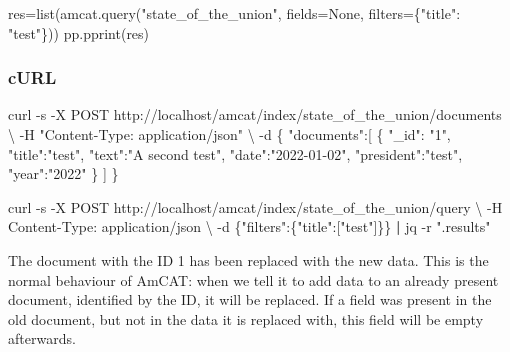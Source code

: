 \documentclass[
  letterpaper,
  DIV=11,
  numbers=noendperiod]{scrreprt}
\newenvironment{Shaded}{\begin{snugshade}}{\end{snugshade}}
\newcommand{\AttributeTok}[1]{\textcolor[rgb]{0.40,0.45,0.13}{#1}}
\newcommand{\BuiltInTok}[1]{\textcolor[rgb]{0.00,0.23,0.31}{#1}}
\newcommand{\DataTypeTok}[1]{\textcolor[rgb]{0.68,0.00,0.00}{#1}}
\newcommand{\ExtensionTok}[1]{\textcolor[rgb]{0.00,0.23,0.31}{#1}}
\newcommand{\KeywordTok}[1]{\textcolor[rgb]{0.00,0.23,0.31}{\textbf{#1}}}
\newcommand{\NormalTok}[1]{\textcolor[rgb]{0.00,0.23,0.31}{#1}}
\newcommand{\OperatorTok}[1]{\textcolor[rgb]{0.37,0.37,0.37}{#1}}
\newcommand{\StringTok}[1]{\textcolor[rgb]{0.13,0.47,0.30}{#1}}
\newcommand{\VariableTok}[1]{\textcolor[rgb]{0.07,0.07,0.07}{#1}}
\begin{document}
\begin{Shaded}
\begin{Highlighting}[]
\NormalTok{res}\OperatorTok{=}\BuiltInTok{list}\NormalTok{(amcat.query(}\StringTok{"state\_of\_the\_union"}\NormalTok{, fields}\OperatorTok{=}\VariableTok{None}\NormalTok{, filters}\OperatorTok{=}\NormalTok{\{}\StringTok{"title"}\NormalTok{: }\StringTok{"test"}\NormalTok{\}))}
\NormalTok{pp.pprint(res)}
\end{Highlighting}
\end{Shaded}

\subsubsection{cURL}

\begin{Shaded}
\begin{Highlighting}[]
\ExtensionTok{curl} \AttributeTok{{-}s} \AttributeTok{{-}X}\NormalTok{ POST http://localhost/amcat/index/state\_of\_the\_union/documents }\DataTypeTok{\textbackslash{}}
  \AttributeTok{{-}H} \StringTok{"Content{-}Type: application/json"} \DataTypeTok{\textbackslash{}}
  \AttributeTok{{-}d} \StringTok{\textquotesingle{}\{}
\StringTok{        "documents":[}
\StringTok{          \{}
\StringTok{            "\_id": "1",}
\StringTok{            "title":"test",}
\StringTok{            "text":"A second test",}
\StringTok{            "date":"2022{-}01{-}02",}
\StringTok{            "president":"test",}
\StringTok{            "year":"2022"}
\StringTok{          \}}
\StringTok{        ]}
\StringTok{      \}\textquotesingle{}}
\end{Highlighting}
\end{Shaded}

\begin{Shaded}
\begin{Highlighting}[]
\ExtensionTok{curl} \AttributeTok{{-}s} \AttributeTok{{-}X}\NormalTok{ POST http://localhost/amcat/index/state\_of\_the\_union/query }\DataTypeTok{\textbackslash{}}
  \AttributeTok{{-}H} \StringTok{\textquotesingle{}Content{-}Type: application/json\textquotesingle{}} \DataTypeTok{\textbackslash{}}
  \AttributeTok{{-}d} \StringTok{\textquotesingle{}\{"filters":\{"title":["test"]\}\}\textquotesingle{}} \KeywordTok{|} \ExtensionTok{jq} \AttributeTok{{-}r} \StringTok{".results"}
\end{Highlighting}
\end{Shaded}

The document with the ID 1 has been replaced with the new data. This is
the normal behaviour of AmCAT: when we tell it to add data to an already
present document, identified by the ID, it will be replaced. If a field
was present in the old document, but not in the data it is replaced
with, this field will be empty afterwards.
\end{document}
